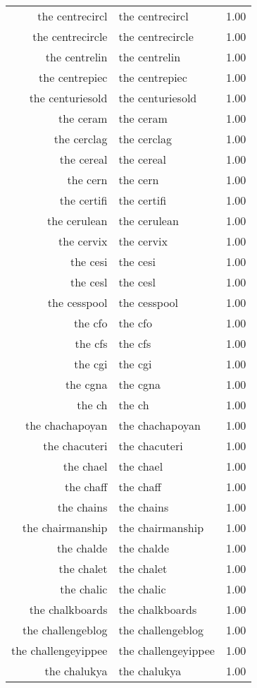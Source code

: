 \begin{table}[ht]
\begin{tabular}{rlr}
  the centrecircl & the centrecircl & 1.00 \\ 
  the centrecircle & the centrecircle & 1.00 \\ 
  the centrelin & the centrelin & 1.00 \\ 
  the centrepiec & the centrepiec & 1.00 \\ 
  the centuriesold & the centuriesold & 1.00 \\ 
  the ceram & the ceram & 1.00 \\ 
  the cerclag & the cerclag & 1.00 \\ 
  the cereal & the cereal & 1.00 \\ 
  the cern & the cern & 1.00 \\ 
  the certifi & the certifi & 1.00 \\ 
  the cerulean & the cerulean & 1.00 \\ 
  the cervix & the cervix & 1.00 \\ 
  the cesi & the cesi & 1.00 \\ 
  the cesl & the cesl & 1.00 \\ 
  the cesspool & the cesspool & 1.00 \\ 
  the cfo & the cfo & 1.00 \\ 
  the cfs & the cfs & 1.00 \\ 
  the cgi & the cgi & 1.00 \\ 
  the cgna & the cgna & 1.00 \\ 
  the ch & the ch & 1.00 \\ 
  the chachapoyan & the chachapoyan & 1.00 \\ 
  the chacuteri & the chacuteri & 1.00 \\ 
  the chael & the chael & 1.00 \\ 
  the chaff & the chaff & 1.00 \\ 
  the chains & the chains & 1.00 \\ 
  the chairmanship & the chairmanship & 1.00 \\ 
  the chalde & the chalde & 1.00 \\ 
  the chalet & the chalet & 1.00 \\ 
  the chalic & the chalic & 1.00 \\ 
  the chalkboards & the chalkboards & 1.00 \\ 
  the challengeblog & the challengeblog & 1.00 \\ 
  the challengeyippee & the challengeyippee & 1.00 \\ 
  the chalukya & the chalukya & 1.00 \\ 

\end{tabular}
\end{table}
